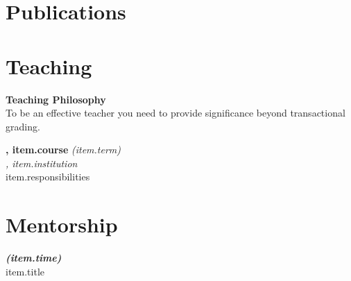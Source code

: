 \documentclass[margin,11pt]{res} %
\begin{document}
\vspace{6pt}
\section{\large Publications}

{%
{%

\vspace{6pt}
\section{\large Teaching}

{\bf Teaching Philosophy}\\
To be an effective teacher you need to provide significance beyond transactional grading.


{%
\begin{samepage}
{\bf{},  {{item.course}}}  \emph{({{item.term}})}\\
\emph{, {{item.institution}}}\\
{{item.responsibilities}}
\end{samepage}

{%

\vspace{6pt}
\section{\large Mentorship}

{%
\begin{samepage}
{\bf{}  \emph{({{item.time}})}}\\
{{item.title}}\\
\emph{}\\
\end{samepage}

}}}}}
\end{document}
